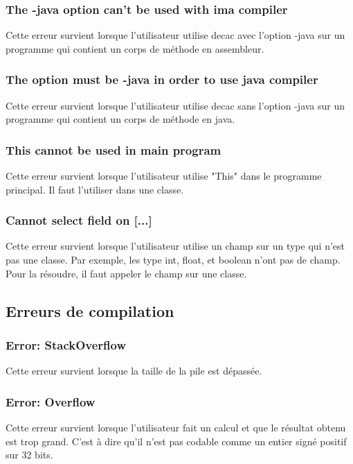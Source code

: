 \documentclass[12pt, a4paper, one side]{article}
\begin{document}
    \subsubsection{The -java option can't be used with ima compiler}
    Cette erreur survient lorsque l'utilisateur utilise decac avec l'option -java sur un programme qui contient un corps de méthode en assembleur.

    \subsubsection{The option must be -java in order to use java compiler}
    Cette erreur survient lorsque l'utilisateur utilise decac sans l'option -java sur un programme qui contient un corps de méthode en java.

    \subsubsection{This cannot be used in main program}
    Cette erreur survient lorsque l'utilisateur utilise "This" dans le programme principal. Il faut l'utiliser dans une classe.

    \subsubsection{Cannot select field on [...]}
    Cette erreur survient lorsque l'utilisateur utilise un champ sur un type qui n'est pas une classe. Par exemple, les type int, float, et boolean n'ont pas de champ. Pour la résoudre, il faut appeler le champ sur une classe.


    \subsection{Erreurs de compilation}
    \subsubsection{Error: StackOverflow}
    Cette erreur survient lorsque la taille de la pile est dépassée.

    \subsubsection{Error: Overflow}
    Cette erreur survient lorsque l'utilisateur fait un calcul et que le résultat obtenu est trop grand. C'est à dire qu'il n'est pas codable comme un entier signé positif sur 32 bits.
\end{document}

